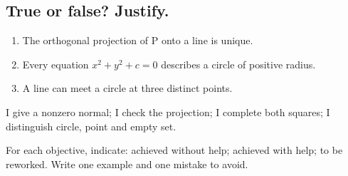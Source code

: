 \subsection*{True or false? Justify.}\label{C07-VF}
\begin{enumerate}
\item The orthogonal projection of P onto a line is unique.
\item Every equation $x^2+y^2+c=0$ describes a circle of positive radius.
\item A line can meet a circle at three distinct points.
\end{enumerate}
\begin{keypoint}I give a nonzero normal; I check the projection; I complete both squares; I distinguish circle, point and empty set.

For each objective, indicate: achieved without help; achieved with help; to be reworked. Write one example and one mistake to avoid.\end{keypoint}
\endgroup
\ifmxteacher{}\fi
